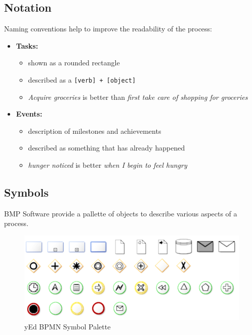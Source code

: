 \documentclass[]{book}
\providecommand{\tightlist}{%
  \setlength{\itemsep}{0pt}\setlength{\parskip}{0pt}}
\begin{document}
\hypertarget{notation}{%
\subsection{Notation}\label{notation}}

Naming conventions help to improve the readability of the process:

\begin{itemize}
\item
  \textbf{Tasks:}

  \begin{itemize}
  \tightlist
  \item
    shown as a rounded rectangle
  \item
    described as a \texttt{{[}verb{]}\ +\ {[}object{]}}
  \item
    \emph{Acquire groceries} is better than \emph{first take care of shopping for groceries}
  \end{itemize}
\item
  \textbf{Events:}

  \begin{itemize}
  \tightlist
  \item
    description of milestones and achievements
  \item
    described as something that has already happened
  \item
    \emph{hunger noticed} is better \emph{when I begin to feel hungry}
  \end{itemize}
\end{itemize}

\hypertarget{symbols}{%
\subsection{Symbols}\label{symbols}}

BMP Software provide a pallette of objects to describe various aspects of a process.

\begin{figure}
\centering
\includegraphics{images/yedpalette.png}
\caption{yEd BPMN Symbol Palette}
\end{figure}
\end{document}
